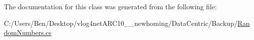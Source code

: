 The documentation for this class was generated from the following file\-:\begin{DoxyCompactItemize}
\item 
C\-:/\-Users/\-Ben/\-Desktop/vlog4net\-A\-R\-C10\-\_\-\_\-newhoming/\-Data\-Centric/\-Backup/\hyperlink{_backup_2_random_numbers_8cs}{Random\-Numbers.\-cs}\end{DoxyCompactItemize}
